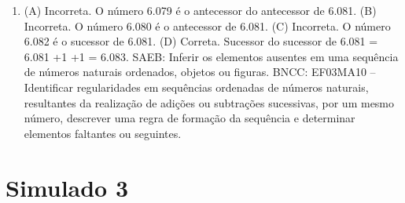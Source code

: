 \begin{enumerate}
\item
(A) Incorreta. O número 6.079 é o antecessor do antecessor de 6.081.
(B) Incorreta. O número 6.080 é o antecessor de 6.081.
(C) Incorreta. O número 6.082 é o sucessor de 6.081.
(D) Correta. Sucessor do sucessor de 6.081 = 6.081 +1 +1 = 6.083.
SAEB: Inferir os elementos ausentes em uma sequência de números naturais ordenados, objetos ou figuras.
BNCC: EF03MA10 -- Identificar regularidades em sequências ordenadas de números naturais,
resultantes da realização de adições ou subtrações sucessivas, por um mesmo número,
descrever uma regra de formação da sequência e determinar elementos faltantes ou seguintes.
\end{enumerate}

\section*{Simulado 3}

